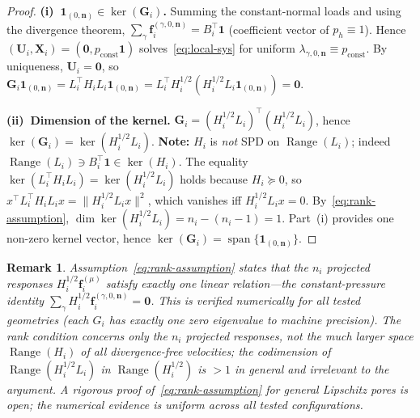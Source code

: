 \documentclass[11pt,a4paper]{article}
\newtheorem{remark}[lemma]{Remark}
\newcommand{\normal}{\bm{n}}
\newcommand{\DtN}{\mathbf{G}}
\newcommand{\one}{\mathbf{1}}
\newcommand{\loadvec}{\bm{f}}
\newcommand{\respvel}{\mathbf{U}}
\begin{document}
\begin{proof}
  \textbf{(i)~$\one_{(0,\normal)} \in \ker(\DtN_i)$.}
  Summing the constant-normal loads and using the divergence theorem,
  $\sum_\gamma \loadvec_i^{(\gamma,0,\normal)} = B_i^\top\mathbf{1}$
  (coefficient vector of $p_h \equiv 1$).
  Hence $(\respvel_i,\mathbf{X}_i) = (\bm{0}, p_{\text{const}}\mathbf{1})$
  solves~\eqref{eq:local-sys} for uniform $\lambda_{\gamma,0,\normal}
  \equiv p_{\text{const}}$.
  By uniqueness, $\respvel_i = \bm{0}$, so
  $\DtN_i\one_{(0,\normal)} = L_i^\top H_i L_i\one_{(0,\normal)}
   = L_i^\top H_i^{1/2}(H_i^{1/2}L_i\one_{(0,\normal)}) = \bm{0}$.

  \textbf{(ii)~Dimension of the kernel.}
  $\DtN_i = (H_i^{1/2}L_i)^\top (H_i^{1/2}L_i)$, hence
  $\ker(\DtN_i) = \ker(H_i^{1/2}L_i)$.  \textbf{Note:}
  $H_i$ is \emph{not} SPD on $\operatorname{Range}(L_i)$; indeed
  $\operatorname{Range}(L_i) \ni B_i^\top\mathbf{1} \in \ker(H_i)$.
  The equality $\ker(L_i^\top H_i L_i) = \ker(H_i^{1/2}L_i)$ holds
  because $H_i \succeq 0$, so $x^\top L_i^\top H_i L_i x
  = \|H_i^{1/2}L_i x\|^2$, which vanishes iff $H_i^{1/2}L_i x = 0$.
  By~\eqref{eq:rank-assumption},
  $\dim\ker(H_i^{1/2}L_i) = n_i - (n_i-1) = 1$.
  Part~(i) provides one non-zero kernel vector, hence
  $\ker(\DtN_i) = \operatorname{span}\{\one_{(0,\normal)}\}$.
\end{proof}

\begin{remark}\label{rem:rank}
  Assumption~\eqref{eq:rank-assumption} states that the $n_i$ projected
  responses $H_i^{1/2}\loadvec_i^{(\mu)}$ satisfy exactly one linear
  relation---the constant-pressure identity
  $\sum_\gamma H_i^{1/2}\loadvec_i^{(\gamma,0,\normal)} = \bm{0}$.
  This is verified numerically for all tested geometries (each $G_i$
  has exactly one zero eigenvalue to machine precision).
  The rank condition concerns only the $n_i$ projected responses, not
  the much larger space $\operatorname{Range}(H_i)$ of all divergence-free
  velocities; the codimension of $\operatorname{Range}(H_i^{1/2}L_i)$
  in $\operatorname{Range}(H_i^{1/2})$ is $>1$ in general and irrelevant
  to the argument.
  A rigorous proof of~\eqref{eq:rank-assumption} for general Lipschitz
  pores is open; the numerical evidence is uniform across all tested
  configurations.
\end{remark}

\end{document}
